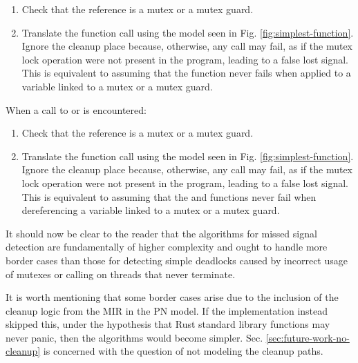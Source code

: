 \begin{enumerate}
      \item Check that the  reference is a mutex or a mutex guard.
      \item Translate the function call using the model seen in Fig. \ref{fig:simplest-function}.
            Ignore the cleanup place because, otherwise, any call may fail,
            as if the mutex lock operation
            were not present in the program, leading to a false lost signal.
            This is equivalent to assuming that the  function never fails
            when applied to a variable linked to a mutex or a mutex guard.
\end{enumerate}

When a call to 
or  is encountered:

\begin{enumerate}
      \item Check that the  reference is a mutex or a mutex guard.
      \item Translate the function call using the model seen in Fig. \ref{fig:simplest-function}.
            Ignore the cleanup place because, otherwise, any call may fail,
            as if the mutex lock operation
            were not present in the program, leading to a false lost signal.
            This is equivalent to assuming that the 
            and  functions never fail
            when dereferencing a variable linked to a mutex or a mutex guard.
\end{enumerate}

It should now be clear to the reader that the algorithms for missed signal detection are
fundamentally of higher complexity and ought to handle more border cases than
those for detecting simple deadlocks caused by incorrect usage of mutexes or
calling  on threads that never terminate.

It is worth mentioning that some border cases arise
due to the inclusion of the cleanup logic
from the \acrshort{MIR} in the \acrshort{PN} model.
If the implementation instead skipped this,
under the hypothesis that Rust standard library functions may never panic,
then the algorithms would become simpler.
Sec. \ref{sec:future-work-no-cleanup} is concerned with
the question of not modeling the cleanup paths.